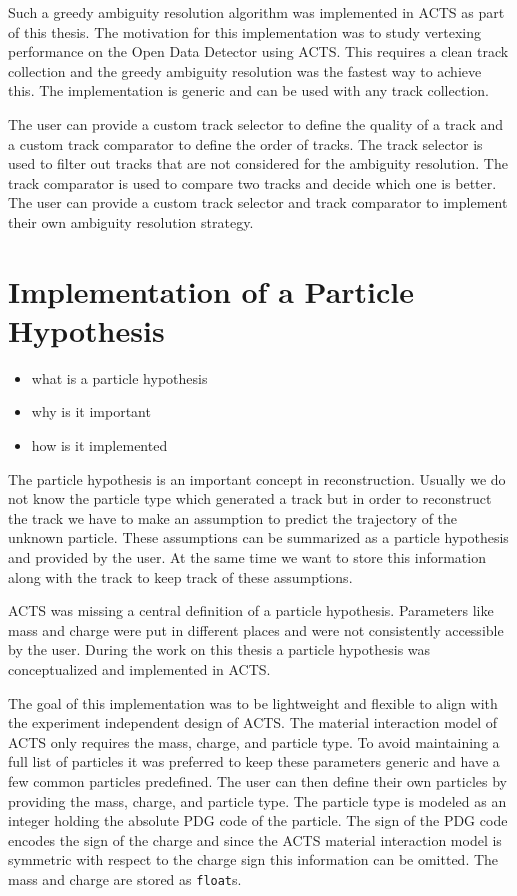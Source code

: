 Such a greedy ambiguity resolution algorithm was implemented in ACTS as part of this thesis. The motivation for this implementation was to study vertexing performance on the Open Data Detector using ACTS. This requires a clean track collection and the greedy ambiguity resolution was the fastest way to achieve this. The implementation is generic and can be used with any track collection.

The user can provide a custom track selector to define the quality of a track and a custom track comparator to define the order of tracks. The track selector is used to filter out tracks that are not considered for the ambiguity resolution. The track comparator is used to compare two tracks and decide which one is better. The user can provide a custom track selector and track comparator to implement their own ambiguity resolution strategy.

\section{Implementation of a Particle Hypothesis}

\begin{itemize}
    \color{red}
    \item what is a particle hypothesis
    \item why is it important
    \item how is it implemented
\end{itemize}

The particle hypothesis is an important concept in reconstruction. Usually we do not know the particle type which generated a track but in order to reconstruct the track we have to make an assumption to predict the trajectory of the unknown particle. These assumptions can be summarized as a particle hypothesis and provided by the user. At the same time we want to store this information along with the track to keep track of these assumptions.

ACTS was missing a central definition of a particle hypothesis. Parameters like mass and charge were put in different places and were not consistently accessible by the user. During the work on this thesis a particle hypothesis was conceptualized and implemented in ACTS.

The goal of this implementation was to be lightweight and flexible to align with the experiment independent design of ACTS. The material interaction model of ACTS only requires the mass, charge, and particle type. To avoid maintaining a full list of particles it was preferred to keep these parameters generic and have a few common particles predefined. The user can then define their own particles by providing the mass, charge, and particle type. The particle type is modeled as an integer holding the absolute PDG code of the particle. The sign of the PDG code encodes the sign of the charge and since the ACTS material interaction model is symmetric with respect to the charge sign this information can be omitted. The mass and charge are stored as \texttt{float}s.

